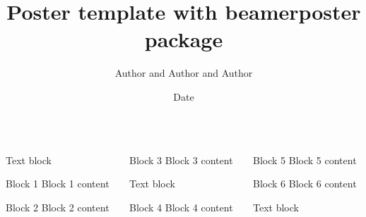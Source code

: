 \documentclass[final]{beamer}
\title[Poster Template]{Poster template with beamerposter package}
\author[Authors]{Author and Author and Author}
\institute[NArFU]{Northern (Arctic) Federal University}
\date{Date}
\begin{document}
 \begin{frame}{} 
\begin{beamercolorbox}{}
\maketitle
\end{beamercolorbox}

\begin{columns}[t]

\begin{column}[t]{0.32\linewidth}

Text block
\bigskip

\begin{block}{\large Block 1}
Block 1 content
\end{block}
\bigskip

\begin{block}{\large Block 2}
Block 2 content
\end{block}
\bigskip

\end{column}

\begin{column}[t]{0.32\linewidth}

\begin{block}{\large Block 3}
Block 3 content
\end{block}
\bigskip

Text block
\bigskip

\begin{block}{\large Block 4}
Block 4 content
\end{block}
\bigskip

\end{column}

\begin{column}[t]{0.32\linewidth}

\begin{block}{\large Block 5}
Block 5 content
\end{block}
\bigskip

\begin{block}{\large Block 6}
Block 6 content
\end{block}
\bigskip

Text block
\bigskip

\end{column}

\end{columns}

\end{frame} 
\end{document}

